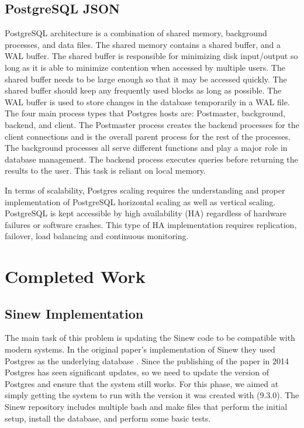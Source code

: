 \documentclass[sigconf]{acmart}
\begin{document}
   \subsection{PostgreSQL JSON}
    PostgreSQL architecture \cite{PostgresMedium} is a combination of shared memory, background processes, and data files. The shared memory contains a shared buffer, and a WAL buffer. The shared buffer is responsible for minimizing disk input/output so long as it is able to minimize contention when accessed by multiple users. The shared buffer needs to be large enough so that it may be accessed quickly. The shared buffer should keep any frequently used blocks as long as possible. The WAL buffer is used to store changes in the database temporarily in a WAL file. The four main process types that Postgres hosts are: Postmaster, background, backend, and client. The Postmaster process creates the backend processes for the client connections and is the overall parent process for the rest of the processes. The background processes all serve different functions and play a major role in database management. The backend process executes queries before returning the results to the user. This task is reliant on local memory.

    In terms of scalability, Postgres scaling\cite{Postgres-scalable} requires the understanding and proper implementation of PostgreSQL horizontal scaling as well as vertical scaling. PostgreSQL is kept accessible by high availability (HA) regardless of hardware failures or software crashes. This type of HA implementation requires replication, failover, load balancing and continuous monitoring.


\section{Completed Work}
    \subsection{Sinew Implementation}
    The main task of this problem is updating the Sinew code to be compatible with modern systems. In the original paper's implementation of Sinew they used Postgres as the underlying database \cite{Tahara_Diamond_Abadi_2014}. Since the publishing of the paper in 2014 Postgres has seen significant updates, so we need to update the version of Postgres and ensure that the system still works. For this phase, we aimed at simply getting the system to run with the version it was created with (9.3.0). The Sinew repository includes multiple bash and make files that perform the initial setup, install the database, and perform some basic tests.
\end{document}
